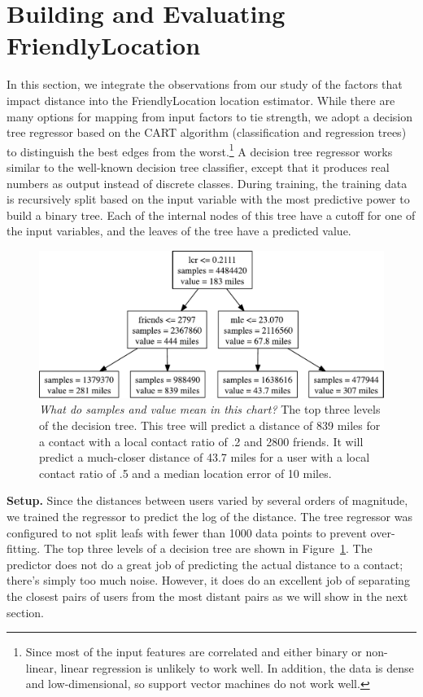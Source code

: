 \documentclass{sig-alternate}
\newcommand{\jam}[1]{\emph{#1}}
\begin{document}
\section{Building and Evaluating FriendlyLocation}

In this section, we integrate the observations from our study of the factors
that impact distance into the FriendlyLocation location estimator.
%
While there are many options for mapping from input factors to tie strength, we
adopt a decision tree regressor based on the CART algorithm (classification and
regression trees) to distinguish the best edges from the worst.\footnote{Since
    most of the input features are correlated and either binary or non-linear,
    linear regression is unlikely to work well.
    In addition, the data is dense and low-dimensional, so support vector machines
    do not work well.}
%
A decision tree regressor works similar to the well-known decision tree
classifier, except that it produces real numbers as output instead of discrete
classes.
%
During training, the training data is recursively split based on the input
variable with the most predictive power to build a binary tree.
%
Each of the internal nodes of this tree have a cutoff for one of the input
variables, and the leaves of the tree have a predicted value.


\begin{figure}[tb]
\centering
\includegraphics[width=.8\linewidth]{figures/tree_top.pdf}
\caption{
    \jam{What do samples and value mean in this chart?}
    The top three levels of the decision tree. This tree will predict a
    distance of 839 miles for a contact with a local contact ratio of .2 and
    2800 friends. It will predict a much-closer distance of 43.7 miles for a
    user with a local contact ratio of .5 and a median location error of 10
    miles.
}
\label{fig:TreeTop}
\vspace{-2pt}
\end{figure}

\noindent\textbf{Setup.} Since the distances between users varied by several
orders of magnitude, we trained the regressor to predict the log of the
distance.
%
The tree regressor was configured to not split leafs with fewer than 1000 data
points to prevent over-fitting.
%
The top three levels of a decision tree are shown in Figure~\ref{fig:TreeTop}.
%
The predictor does not do a great job of predicting the actual distance to a
contact; there's simply too much noise.
%
However, it does do an excellent job of separating the closest pairs of users
from the most distant pairs as we will show in the next section.
\end{document}
